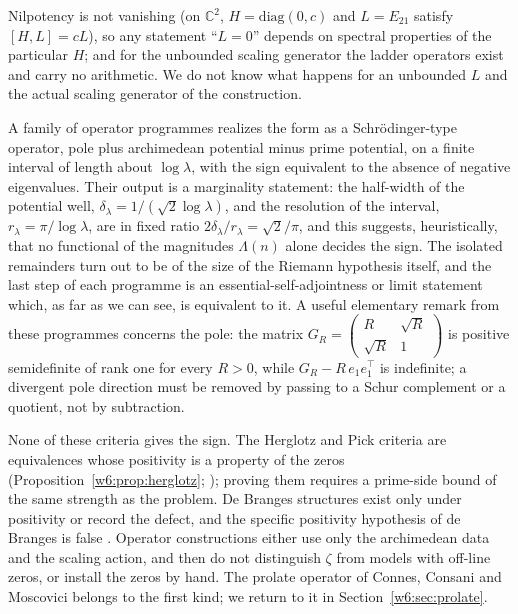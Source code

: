 \documentclass[11pt]{amsart}
\theoremstyle{definition}
\theoremstyle{remark}
\numberwithin{equation}{section}
\newcommand{\C}{\mathbb{C}}
\begin{document}
Nilpotency is not vanishing (on $\C^2$, $H=\mathrm{diag}(0,c)$ and $L=E_{21}$ satisfy $[H,L]=cL$),
so any statement ``$L=0$'' depends on spectral properties of the particular $H$; and for the
unbounded scaling generator the ladder operators exist and carry no arithmetic. We do not know
what happens for an unbounded $L$ and the actual scaling generator of the construction.

A family of operator programmes realizes the form as a Schr\"odinger-type operator, pole plus
archimedean potential minus prime potential, on a finite interval of length about $\log\lambda$,
with the sign equivalent to the absence of negative eigenvalues. Their output is a marginality
statement: the half-width of the potential well, $\delta_\lambda=1/(\sqrt2\log\lambda)$, and the
resolution of the interval, $r_\lambda=\pi/\log\lambda$, are in fixed ratio
$2\delta_\lambda/r_\lambda=\sqrt2/\pi$, and this suggests, heuristically, that no functional of the
magnitudes $\Lambda(n)$ alone decides the sign. The isolated remainders turn out to be of the size
of the Riemann hypothesis itself, and the last step of each programme is an
essential-self-adjointness or limit statement which, as far as we can see, is equivalent to it. A
useful elementary remark from these programmes concerns the pole: the matrix
$G_R=\begin{pmatrix}R&\sqrt R\\ \sqrt R&1\end{pmatrix}$ is positive semidefinite of rank one for
every $R>0$, while $G_R-R\,e_1e_1^{\!\top}$ is indefinite; a divergent pole direction must be
removed by passing to a Schur complement or a quotient, not by subtraction.

None of these criteria gives the sign. The Herglotz and Pick criteria are equivalences whose
positivity is a property of the zeros
(Proposition~\ref{w6:prop:herglotz}; \cite[Corollary~9.246]{P36}); proving them requires a
prime-side bound of the same strength as the problem. De Branges structures exist only under
positivity or record the defect, and the specific positivity hypothesis of de Branges is false
\cite{ConreyLi2000}. Operator constructions either use only the archimedean data and the scaling
action, and then do not distinguish $\zeta$ from models with off-line zeros, or install the zeros
by hand. The prolate operator of Connes, Consani and Moscovici belongs to the first kind; we
return to it in Section~\ref{w6:sec:prolate}.
\end{document}
